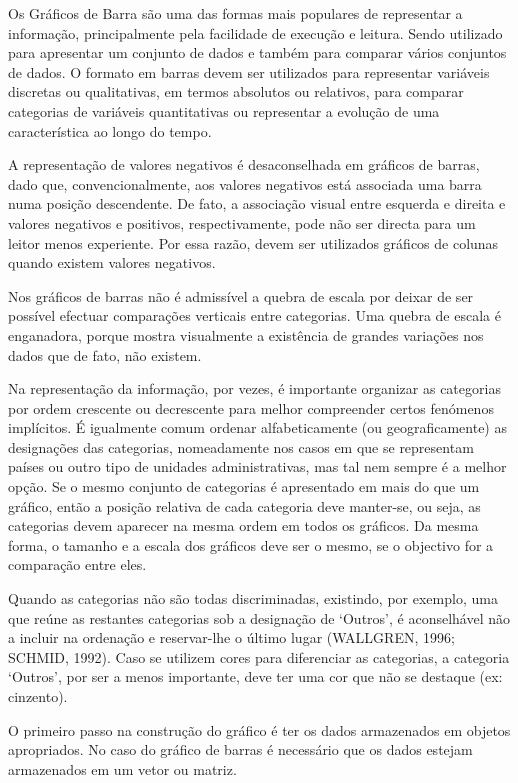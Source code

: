 Os Gráficos de Barra são uma das formas mais populares de representar a informação, principalmente pela facilidade de execução e leitura. Sendo utilizado para apresentar um conjunto de dados e também para comparar vários conjuntos de dados. O formato em barras devem ser utilizados para representar variáveis discretas ou qualitativas, em termos absolutos ou relativos, para comparar categorias de variáveis quantitativas ou representar a evolução de uma característica ao longo do tempo.\vskip0.3cm

A representação de valores negativos é desaconselhada em gráficos de barras, dado que, convencionalmente, aos valores negativos está associada uma barra numa posição descendente. De fato, a associação visual entre esquerda e direita e valores negativos e positivos, respectivamente, pode não ser directa para um leitor menos experiente. Por essa razão, devem ser utilizados gráficos de colunas quando existem valores negativos.\vskip0.3cm

Nos gráficos de barras não é admissível a quebra de escala por deixar de ser possível efectuar comparações verticais entre categorias. Uma quebra de escala é enganadora, porque mostra visualmente a existência de grandes variações nos dados que de fato, não existem.\vskip0.3cm 

Na representação da informação, por vezes, é importante organizar as categorias por ordem crescente ou decrescente para melhor compreender certos fenómenos implícitos. É igualmente comum ordenar alfabeticamente (ou geograficamente) as designações das categorias, nomeadamente nos casos em que se representam países ou outro tipo de unidades administrativas, mas tal nem sempre é a melhor opção. Se o mesmo conjunto de categorias é apresentado em mais do que um gráfico, então a posição relativa de cada categoria deve manter-se, ou seja, as categorias devem aparecer na mesma ordem em todos os gráficos. Da mesma forma, o tamanho e a escala dos gráficos deve ser o mesmo, se o objectivo for a comparação entre eles. 


\newpage
Quando as categorias não são todas discriminadas, existindo, por exemplo, uma que reúne as restantes categorias sob a designação de ‘Outros’, é aconselhável não a incluir na ordenação e reservar-lhe o último lugar (WALLGREN, 1996; SCHMID, 1992). Caso se utilizem cores para diferenciar as categorias, a categoria ‘Outros’, por ser a menos importante, deve ter uma cor que não se destaque (ex: cinzento). \vskip0.3cm

O primeiro passo na construção do gráfico é ter os dados armazenados em objetos apropriados. No caso do gráfico de barras é necessário que os dados estejam armazenados em um vetor ou matriz.


